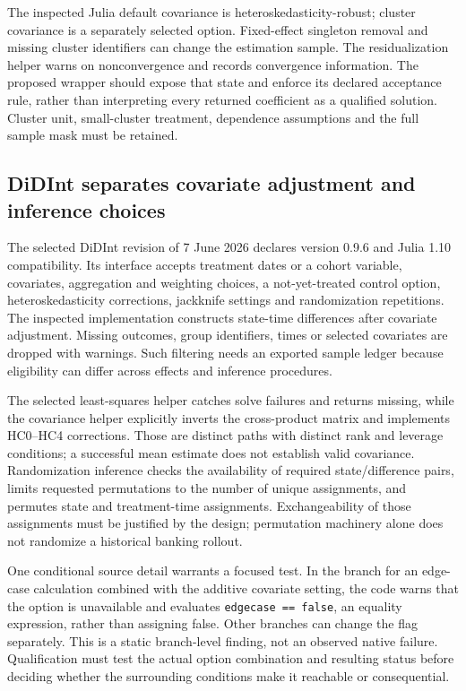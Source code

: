 The inspected Julia default covariance is heteroskedasticity-robust; cluster
covariance is a separately selected option. Fixed-effect singleton removal
and missing cluster identifiers can change the estimation sample. The
residualization helper warns on nonconvergence and records convergence
information. The proposed wrapper should expose that state and enforce its
declared acceptance rule, rather than interpreting every returned coefficient
as a qualified solution. Cluster unit, small-cluster treatment, dependence
assumptions and the full sample mask must be retained.\citep{exec25_panelother_julia}

\subsection{DiDInt separates covariate adjustment and inference choices}
The selected DiDInt revision of 7 June 2026 declares version 0.9.6 and Julia
1.10 compatibility. Its interface accepts treatment dates or a cohort
variable, covariates, aggregation and weighting choices, a not-yet-treated
control option, heteroskedasticity corrections, jackknife settings and
randomization repetitions. The inspected implementation constructs
state-time differences after covariate adjustment. Missing outcomes, group
identifiers, times or selected covariates are dropped with warnings. Such
filtering needs an exported sample ledger because eligibility can differ
across effects and inference procedures.\citep{exec25_panelother_didint}

The selected least-squares helper catches solve failures and returns missing,
while the covariance helper explicitly inverts the cross-product matrix and
implements HC0--HC4 corrections. Those are distinct paths with distinct
rank and leverage conditions; a successful mean estimate does not establish
valid covariance. Randomization inference checks the availability of
required state/difference pairs, limits requested permutations to the number
of unique assignments, and permutes state and treatment-time assignments.
Exchangeability of those assignments must be justified by the design;
permutation machinery alone does not randomize a historical banking rollout.
\citep{exec25_panelother_didint,exec25_panelother_choice}

One conditional source detail warrants a focused test. In the branch for
an edge-case calculation combined with the additive covariate setting, the
code warns that the option is unavailable and evaluates
\texttt{edgecase == false}, an equality expression, rather than assigning
false. Other branches can change the flag separately. This is a static
branch-level finding, not an observed native failure. Qualification must
test the actual option combination and resulting status before deciding
whether the surrounding conditions make it reachable or consequential.
\citep{exec25_panelother_didint}

